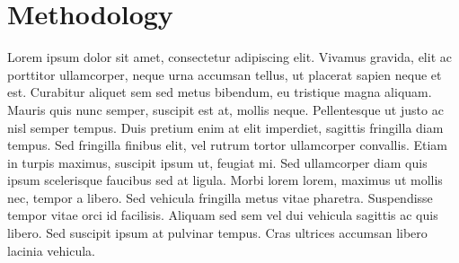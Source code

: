 \section{Methodology}
Lorem ipsum dolor sit amet, consectetur adipiscing elit. Vivamus gravida, elit ac porttitor ullamcorper, neque urna accumsan tellus, ut placerat sapien neque et est. Curabitur aliquet sem sed metus bibendum, eu tristique magna aliquam. Mauris quis nunc semper, suscipit est at, mollis neque. Pellentesque ut justo ac nisl semper tempus. Duis pretium enim at elit imperdiet, sagittis fringilla diam tempus. Sed fringilla finibus elit, vel rutrum tortor ullamcorper convallis. Etiam in turpis maximus, suscipit ipsum ut, feugiat mi. Sed ullamcorper diam quis ipsum scelerisque faucibus sed at ligula. Morbi lorem lorem, maximus ut mollis nec, tempor a libero. Sed vehicula fringilla metus vitae pharetra. Suspendisse tempor vitae orci id facilisis. Aliquam sed sem vel dui vehicula sagittis ac quis libero. Sed suscipit ipsum at pulvinar tempus. Cras ultrices accumsan libero lacinia vehicula.